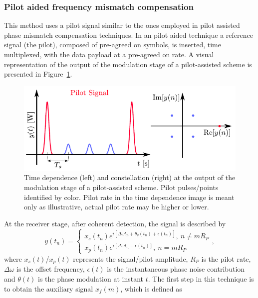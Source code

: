 \begin{refsection}
\subsubsection*{Pilot aided frequency mismatch compensation}

This method uses a pilot signal similar to the ones employed in pilot assisted phase mismatch compensation techniques. In an pilot aided technique a reference signal (the pilot), composed of pre-agreed on symbols, is inserted, time multiplexed, with the data payload at a pre-agreed on rate. A visual representation of the output of the modulation stage of a pilot-assisted scheme is presented in Figure~\ref{fig:pilotMethodExplanation}.
\begin{figure}[h]
\centering
\includegraphics{./lib/frequency_mismatch_compensation/figures/novelMethodConstellation.pdf}
\caption{Time dependence (left) and constellation (right) at the output of the modulation stage of a pilot-assisted scheme. Pilot pulses/points identified by color. Pilot rate in the time dependence image is meant only as illustrative, actual pilot rate may be higher or lower.}
\label{fig:pilotMethodExplanation}
\end{figure}
At the receiver stage, after coherent detection, the signal is described by
\begin{equation}\label{eq:signalAfterCoherentDetection} 
y(t_n)=
\begin{cases}
x_s(t_n)e^{i[\Delta\omega t_n+\theta_q(t_n)+\epsilon(t_n)]},~n\neq mR_P \\
x_p(t_n)e^{i[\Delta\omega t_n+\epsilon(t_n)]},~n=mR_P
\end{cases},
\end{equation}
where $x_s(t)$/$x_p(t)$ represents the signal/pilot amplitude, $R_P$ is the pilot rate, $\Delta\omega$ is the offset frequency, $\epsilon(t)$ is the instantaneous phase noise contribution and $\theta(t)$ is the phase modulation at instant $t$. The first step in this technique is to obtain the auxiliary signal $x_f(m)$, which is defined as

\end{refsection}
